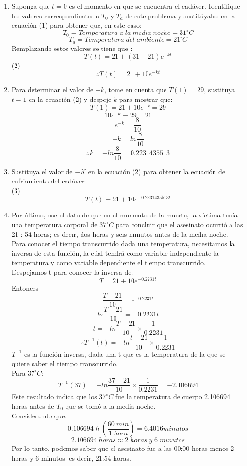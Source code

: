 \documentclass[12pt]{article}
\begin{document}
\begin{enumerate}
\item Suponga que $t = 0$ es el momento en que se encuentra el cadáver. Identifique los valores
correspondientes a $T_0$ y $T_a$ de este problema y sustitúyalos en la ecuación (1) para obtener
que, en este caso:
\[
T_0 = Temperatura \;a \;la\; media \;noche= 31  ^{\circ} C
\]
\[
T_a = Temperatura \;del \;ambiente = 21 ^{\circ}  C
\]
Remplazando estos valores se tiene que : 
\[
T(t)= 21 + (31-21)e^{-kt}
\]
(2)
\[
\therefore  T(t)= 21 + 10e^{-kt}
\]  
\item Para determinar el valor de $-k$, tome en cuenta que $T(1) = 29$, sustituya $t = 1$ en la ecuación (2) y despeje $k$ para mostrar que:
\[
 T(1)= 21 + 10e^{-k} = 29
\]  
\[
 10e^{-k} = 29-21
\]  
\[
  e^{-k} = \frac{8}{10}
\]  
\[
 -k = ln\frac{8}{10}
\]  
\[
 \therefore  k = -ln\frac{8}{10} = 0.2231435513
\] 
\item Sustituya el valor de $-K$ en la ecuación (2) para obtener la ecuación de enfriamiento del
cadáver:\\
(3)
\[
T(t)= 21 + 10e^{-0.2231435513t}
\] 
\item Por último, use el dato de que en el momento de la muerte, la víctima tenía una temperatura
corporal de $37  ^{\circ} C$ para concluir que el asesinato ocurrió a las 21 : 54 horas; es decir, dos horas y seis minutos antes de la media noche.
\\
Para conocer el tiempo transcurrido dada una temperatura, necesitamos la inversa de esta función, la cúal tendrá como variable independiente la temperatura y como variable dependiente el tiempo transcurrido. \\
Despejamos t para conocer la inversa de: 
\[
T= 21 + 10e^{-0.2231t}
\] 
Entonces
\[
\frac{T-21}{10}= e^{-0.2231t}
\] 
\[
ln \frac{T-21}{10}= -0.2231t
\] 
\[
t = -ln \frac{T-21}{10} \times \frac{1}{0.2231}
\]
\[
\therefore T^{-1}(t) = -ln \frac{t-21}{10} \times \frac{1}{0.2231}
\]
$T^{-1}$ es la función inversa, dada una t que es la temperatura de la que se quiere saber el tiempo transcurrido.\\
Para  $37  ^{\circ} C$:
\[
T^{-1}(37) = -ln \frac{37-21}{10} \times \frac{1}{0.2231} = -2.106694
\]
Este resultado indica que los $37  ^{\circ} C$ fue la temperatura de cuerpo 2.106694 horas antes de $T_0$ que se tomó a la media noche.\\
Considerando que:
\[
	0.106694\;h \;(\frac{60 \; min}{1\; hora}) = 6.4016 minutos
\]
\[
2.106694 \; horas \approx 2 \;horas \;y \;6 \;minutos
\]
Por lo tanto, podemos saber que el asesinato fue a las 00:00 horas menos 2 horas y 6 minutos, es decir, 21:54 horas.
\end{enumerate}
\end{document}
